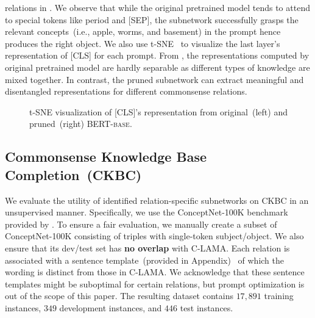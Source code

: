 relations in . We observe that while the original 
pretrained model tends to attend to special tokens like period and [SEP], 
the subnetwork successfully grasps the relevant concepts~(i.e., apple, 
worms, and basement) in the prompt hence produces the right object. 
We also use t-SNE~\citep{vanDerMaaten2008} to visualize the last layer's 
representation of [CLS] for each prompt. From , the 
representations computed by original pretrained model are hardly separable as 
different types of knowledge are mixed together. In contrast, the pruned 
subnetwork can extract meaningful and disentangled representations for 
different commonsense relations.

\begin{figure}[th]
	\centering
	\caption{t-SNE visualization of [CLS]'s representation from original~(left) and pruned~(right) \textsc{BERT-base}.} \label{fig:tsne}
\end{figure}


\subsection{Commonsense Knowledge Base Completion~(CKBC)}
\label{sec:ckbc}
We evaluate the utility of identified relation-specific subnetworks on CKBC in an unsupervised manner. Specifically, we use the ConceptNet-100K benchmark provided by \citet{Li2016}. To ensure a fair evaluation, 
we manually create a subset of ConceptNet-100K 
consisting of triples with single-token subject/object. We also ensure that its dev/test set has \textbf{no overlap} with C-LAMA.
Each relation is associated with a sentence template~(provided in 
Appendix)~\citep{Kwon2019} of which the wording is distinct from 
those in C-LAMA. We acknowledge that these sentence templates might be suboptimal for certain relations, but prompt optimization is 
out of the scope of this paper. The resulting dataset contains 
$17,891$ training instances, $349$ development instances, 
and $446$ test instances.

